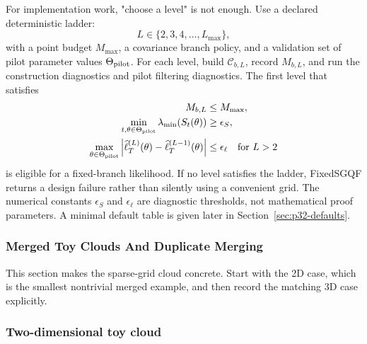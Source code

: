 \documentclass[11pt]{article}
\numberwithin{equation}{section}
\newcommand{\ellhat}{\widehat\ell}
\begin{document}
For implementation work, "choose a level" is not enough.  Use a declared
deterministic ladder:
\begin{equation}
  L\in\{2,3,4,\ldots,L_{\max}\},
  \label{eq:p32-level-ladder}
\end{equation}
with a point budget \(M_{\max}\), a covariance branch policy, and a validation
set of pilot parameter values \(\Theta_{\rm pilot}\).  For each level, build
\(\mathcal C_{b,L}\), record \(M_{b,L}\), and run the construction diagnostics
and pilot filtering diagnostics.  The first level that satisfies
\begin{align}
  M_{b,L}&\le M_{\max},
  \label{eq:p32-ladder-budget}\\
  \min_{t,\theta\in\Theta_{\rm pilot}}\lambda_{\min}(S_t(\theta))
  &\ge \epsilon_S,
  \label{eq:p32-ladder-S}\\
  \max_{\theta\in\Theta_{\rm pilot}}
  \left|
  \ellhat_T^{(L)}(\theta)-\ellhat_T^{(L-1)}(\theta)
  \right|
  &\le \epsilon_\ell
  \quad\hbox{for }L>2
  \label{eq:p32-ladder-likelihood}
\end{align}
is eligible for a fixed-branch likelihood.  If no level satisfies the ladder,
FixedSGQF returns a design failure rather than silently using a convenient
grid.  The numerical constants \(\epsilon_S\) and \(\epsilon_\ell\) are
diagnostic thresholds, not mathematical proof parameters.  A minimal default
table is given later in Section~\ref{sec:p32-defaults}.

\subsubsection{Merged Toy Clouds And Duplicate Merging}
\label{sec:p31-toy-grid}

This section makes the sparse-grid cloud concrete.  Start with the 2D case,
which is the smallest nontrivial merged example, and then record the matching 3D
case explicitly.

\subsubsection{Two-dimensional toy cloud}
\end{document}
